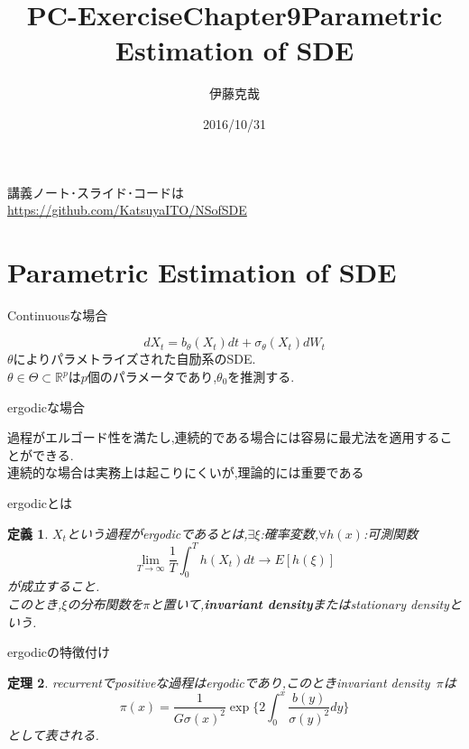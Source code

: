 \documentclass[dvipdfmx,cjk]{beamer}
\title{PC-ExerciseChapter9}
\numberwithin{equation}{section}
\newtheorem{Thm}     {定理}[section]
\newtheorem{Def}     [Thm]{定義}
\def\R{\mathbb R}
\def\thm{\begin{Thm}}
\def\thmx{\end{Thm}}
\def\defb{\begin{Def}}
\def\defx{\end{Def}}
\begin{document}
\title[Parametric Estimation of SDE]{Parametric Estimation of SDE} 
\author[Katsuya ITO]{伊藤克哉} 
\date{2016/10/31}

\begin{frame}
\titlepage    
\end{frame}
\begin{frame}
講義ノート･スライド･コードは\\
\url{https://github.com/KatsuyaITO/NSofSDE}
\end{frame}
\begin{frame}
\tableofcontents
\end{frame}



\section{Parametric Estimation of SDE}
\begin{frame}{Continuousな場合}

\[
dX_t = b_\theta (X_t) dt + \sigma_\theta(X_t) dW_t
\]
$\theta$によりパラメトライズされた自励系のSDE.\\
$\theta \in \Theta \subset \R^p$は$p$個のパラメータであり,$\theta_0$を推測する.
\end{frame}

\begin{frame}{ergodicな場合}

過程がエルゴード性を満たし,連続的である場合には容易に最尤法を適用することができる.\\
連続的な場合は実務上は起こりにくいが,理論的には重要である
\end{frame}

\begin{frame}{ergodicとは}
\defb
$X_t$という過程がergodicであるとは,$\exists\xi$:確率変数,$\forall h(x)$:可測関数
\[
\lim_{T\to \infty} \frac{1}{T} \int_0^T h(X_t) dt  \to E[h(\xi)]
\]
が成立すること.\\
このとき,$\xi$の分布関数を$\pi$と置いて,{\bf invariant density}またはstationary densityという.
\defx
\end{frame}
\begin{frame}{ergodicの特徴付け}

\thm
recurrentでpositiveな過程はergodicであり,このときinvariant density\ $\pi$は
\[
\pi(x) = \frac{1}{G\sigma(x)^2} 
	\exp 
	\biggl\{ 
		2 \int_0^x \frac{b(y)}{\sigma(y)^2}dy 
	\biggl\}
\]
として表される.
\thmx
\end{frame}
\end{document}
